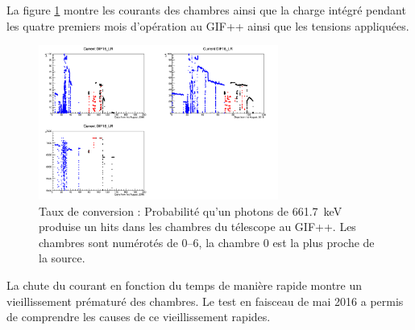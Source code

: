 La figure \ref{Courant} montre les courants des chambres ainsi que la charge intégré pendant les quatre premiers mois d'opération au GIF++ ainsi que les tensions appliquées. 

\begin{figure}[!ht]
	\centering
	\includegraphics[width=0.7\textwidth]{GLA/DIF16.png}
	\caption{Taux de conversion : Probabilité qu'un photons de \SI{661.7}{\kilo\eV} produise un hits dans les chambres du télescope au GIF++. Les chambres sont numérotés de \SIrange{0}{6}{}, la chambre \num{0} est la plus proche de la source.}
	\label{Courant}
\end{figure}


La chute du courant en fonction du temps de manière rapide montre un vieillissement prématuré des chambres. Le test en faisceau de mai 2016 a permis de comprendre les causes de ce vieillissement rapides.

